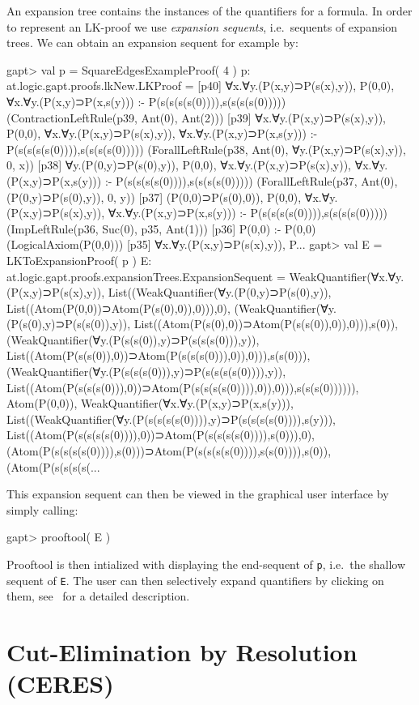 \documentclass[a4paper,11pt]{article}
\newcommand{\cli}[1]{{\tt {#1}}}
\begin{document}
An expansion tree contains the instances of the quantifiers for a formula. In order
to represent an LK-proof we use {\em expansion sequents}, i.e.~sequents of expansion trees.
We can obtain an expansion sequent for example by:
\begin{clilisting}
gapt> val p = SquareEdgesExampleProof( 4 )
p: at.logic.gapt.proofs.lkNew.LKProof =
[p40] ∀x.∀y.(P(x,y)⊃P(s(x),y)), P(0,0), ∀x.∀y.(P(x,y)⊃P(x,s(y))) :- P(s(s(s(s(0)))),s(s(s(s(0)))))    (ContractionLeftRule(p39, Ant(0), Ant(2)))
[p39] ∀x.∀y.(P(x,y)⊃P(s(x),y)), P(0,0), ∀x.∀y.(P(x,y)⊃P(s(x),y)), ∀x.∀y.(P(x,y)⊃P(x,s(y))) :- P(s(s(s(s(0)))),s(s(s(s(0)))))    (ForallLeftRule(p38, Ant(0), ∀y.(P(x,y)⊃P(s(x),y)), 0, x))
[p38] ∀y.(P(0,y)⊃P(s(0),y)), P(0,0), ∀x.∀y.(P(x,y)⊃P(s(x),y)), ∀x.∀y.(P(x,y)⊃P(x,s(y))) :- P(s(s(s(s(0)))),s(s(s(s(0)))))    (ForallLeftRule(p37, Ant(0), (P(0,y)⊃P(s(0),y)), 0, y))
[p37] (P(0,0)⊃P(s(0),0)), P(0,0), ∀x.∀y.(P(x,y)⊃P(s(x),y)), ∀x.∀y.(P(x,y)⊃P(x,s(y))) :- P(s(s(s(s(0)))),s(s(s(s(0)))))    (ImpLeftRule(p36, Suc(0), p35, Ant(1)))
[p36] P(0,0) :- P(0,0)    (LogicalAxiom(P(0,0)))
[p35] ∀x.∀y.(P(x,y)⊃P(s(x),y)), P...
gapt> val E = LKToExpansionProof( p )
E: at.logic.gapt.proofs.expansionTrees.ExpansionSequent = WeakQuantifier(∀x.∀y.(P(x,y)⊃P(s(x),y)), List((WeakQuantifier(∀y.(P(0,y)⊃P(s(0),y)), List((Atom(P(0,0))⊃Atom(P(s(0),0)),0))),0), (WeakQuantifier(∀y.(P(s(0),y)⊃P(s(s(0)),y)), List((Atom(P(s(0),0))⊃Atom(P(s(s(0)),0)),0))),s(0)), (WeakQuantifier(∀y.(P(s(s(0)),y)⊃P(s(s(s(0))),y)), List((Atom(P(s(s(0)),0))⊃Atom(P(s(s(s(0))),0)),0))),s(s(0))), (WeakQuantifier(∀y.(P(s(s(s(0))),y)⊃P(s(s(s(s(0)))),y)), List((Atom(P(s(s(s(0))),0))⊃Atom(P(s(s(s(s(0)))),0)),0))),s(s(s(0)))))), Atom(P(0,0)), WeakQuantifier(∀x.∀y.(P(x,y)⊃P(x,s(y))), List((WeakQuantifier(∀y.(P(s(s(s(s(0)))),y)⊃P(s(s(s(s(0)))),s(y))), List((Atom(P(s(s(s(s(0)))),0))⊃Atom(P(s(s(s(s(0)))),s(0))),0), (Atom(P(s(s(s(s(0)))),s(0)))⊃Atom(P(s(s(s(s(0)))),s(s(0)))),s(0)), (Atom(P(s(s(s(s(...
\end{clilisting}
This expansion sequent can then be viewed in the graphical user interface by simply calling:
\begin{clilisting}
gapt> prooftool( E )

\end{clilisting}
Prooftool is then intialized with displaying the end-sequent of \cli{p}, i.e.\ the shallow sequent
of \cli{E}. The user can then selectively expand quantifiers by clicking on them, see~\cite{Hetzl13Understanding}
for a detailed description.


\section{Cut-Elimination by Resolution (CERES)}
\end{document}
